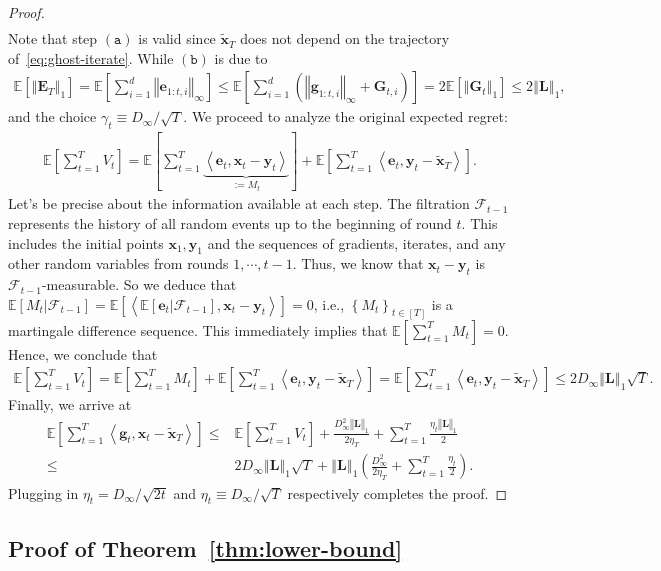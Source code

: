 \documentclass{article}
\def \y {\mathbf{y}}
\def \E {\mathbb{E}}
\def \x {\mathbf{x}}
\def \g {\mathbf{g}}
\def \F {\mathcal{F}}
\def \xt {\widetilde{\x}}
\def \Gb {\mathbf{G}}
\def \Lb {\mathbf{L}}
\def \e {\mathbf{e}}
\def \EB {\mathbf{E}}
\newcommand{\inner}[2]{\left\langle #1, #2 \right\rangle}
\newcommand{\norm}[1]{\left\Vert#1\right\Vert}
\newcommand{\sqbrac}[1]{\left[#1\right]}
\newcommand{\brac}[1]{\left(#1\right)}
\newcommand{\cbrac}[1]{\left\{#1\right\}}
\begin{document}
\begin{proof}
\begin{align*}
\end{align*}
Note that step $\mathtt{(a)}$ is valid since $\xt_T$ does not depend on the trajectory of~\eqref{eq:ghost-iterate}. While $\mathtt{(b)}$ is due to
\begin{align*}
    \E\sqbrac{\norm{\EB_T}_1}=\E\sqbrac{\sum_{i=1}^d\norm{\e_{1:t,i}}_\infty}\le\E\sqbrac{\sum_{i=1}^d\brac{\norm{\g_{1:t,i}}_\infty+\Gb_{t,i}}}=2\E\sqbrac{\norm{\Gb_t}_1}\le2\norm{\Lb}_1,
\end{align*}
and the choice $\gamma_t\equiv D_\infty/\sqrt{T}$. We proceed to analyze the original expected regret:
\begin{align*}
    \E\sqbrac{\sum_{t=1}^TV_t}=\E\sqbrac{\sum_{t=1}^T\underbrace{\inner{\e_t}{\x_t-\y_t}}_{:=M_t}}+\E\sqbrac{\sum_{t=1}^T\inner{\e_t}{\y_t-\xt_T}}.
\end{align*}
Let's be precise about the information available at each step. The filtration $\F_{t-1}$ represents the history of all random events up to the beginning of round $t$. This includes the initial points $\x_1,\y_1$ and the sequences of gradients, iterates, and any other random variables from rounds $1,\cdots,t-1$. Thus, we know that $\x_t-\y_t$ is $\F_{t-1}$-measurable. So we deduce that $\E[M_t|\F_{t-1}]=\E\sqbrac{\inner{\E[\e_t|\F_{t-1}]}{\x_t-\y_t}}=0$, i.e., $\cbrac{M_t}_{t\in[T]}$ is a martingale difference sequence. This immediately implies that $\E[\sum_{t=1}^TM_t]=0$. Hence, we conclude that
\begin{align*}
    \E\sqbrac{\sum_{t=1}^TV_t}=\E\sqbrac{\sum_{t=1}^TM_t}+\E\sqbrac{\sum_{t=1}^T\inner{\e_t}{\y_t-\xt_T}}=\E\sqbrac{\sum_{t=1}^T\inner{\e_t}{\y_t-\xt_T}}\le2D_\infty\norm{\Lb}_1\sqrt{T}.
\end{align*}
Finally, we arrive at
\begin{align*}
    \E\sqbrac{\sum_{t=1}^T\inner{\g_t}{\x_{t}-\xt_T}}\le&\E\sqbrac{\sum_{t=1}^TV_t}+\frac{D_\infty^2\norm{\Lb}_1}{2\eta_T}+\sum_{t=1}^T\frac{\eta_t\norm{\Lb}_1}{2}\\\le&2D_\infty\norm{\Lb}_1\sqrt{T}+\norm{\Lb}_1\brac{\frac{D_\infty^2}{2\eta_T}+\sum_{t=1}^T\frac{\eta_t}{2}}.
\end{align*}
Plugging in $\eta_t=D_\infty/\sqrt{2t}$ and $\eta_t\equiv D_\infty/\sqrt{T}$ respectively completes the proof.
\end{proof}

\subsection{Proof of Theorem~\ref{thm:lower-bound}\label{app:sec:proof-lower-bound}}
\end{document}
